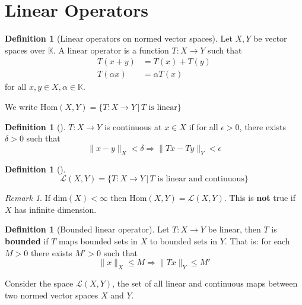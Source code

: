\documentclass[justified]{tufte-book}
\theoremstyle{plain}%
\theoremstyle{definition}
\newtheorem{defn}[thm]{Definition}
\theoremstyle{remark}
\newtheorem*{rem}{Remark}
\newcommand{\K}{\mathbb{K}}
\begin{document}
\section{Linear Operators} %
\label{sec:linear_operators}

\begin{defn}[Linear operators on normed vector spaces]
  Let $X,Y$ be vector spaces over $\K$.  A linear operator is a function $T:X \rightarrow Y$ such that 
  \begin{align*}
      T(x+y) &= T(x) + T(y) \\
      T(\alpha x) &= \alpha T(x)
  \end{align*}
  for all $x,y \in X, \alpha \in \K$.

  We write $\text{Hom}(X,Y) = \{ T: X \rightarrow Y \, | \, \text{$T$ is linear} \}$
\end{defn}

\begin{defn}[]
  $T: X \rightarrow Y$ is continuous at $x \in X$ if for all $\epsilon > 0$, there exists $\delta > 0$ such that \[
          \| x - y \|_X < \delta \Rightarrow \| Tx - Ty \|_Y < \epsilon 
  \]
\end{defn}

\begin{defn}[]
  \[
  \mathcal{L}(X,Y) = \{ T:  X \rightarrow Y \, | \, \text{$T$ is linear and continuous} \}
  \]
\end{defn}

\begin{rem}
  If $\text{dim}(X) < \infty$ then $\text{Hom}(X,Y) = \mathcal{L}(X,Y)$.  This is \textbf{not} true if $X$ has infinite dimension.
\end{rem}

\begin{defn}[Bounded linear operator]
  Let $T: X \rightarrow Y$ be linear, then $T$ is \textbf{bounded} if $T$ maps bounded sets in $X$ to bounded sets in $Y$.  That is: for each $M > 0$ there exists $M' > 0$ such that \[
      \| x \|_X \leq M \Rightarrow \|Tx\|_Y \leq M'
  \]
\end{defn}

\label{sec:lecture_4_}
Consider the space $\mathcal{L}(X, Y)$, the set of all linear and continuous maps between two normed vector spaces $X$ and $Y$.  
\end{document}
